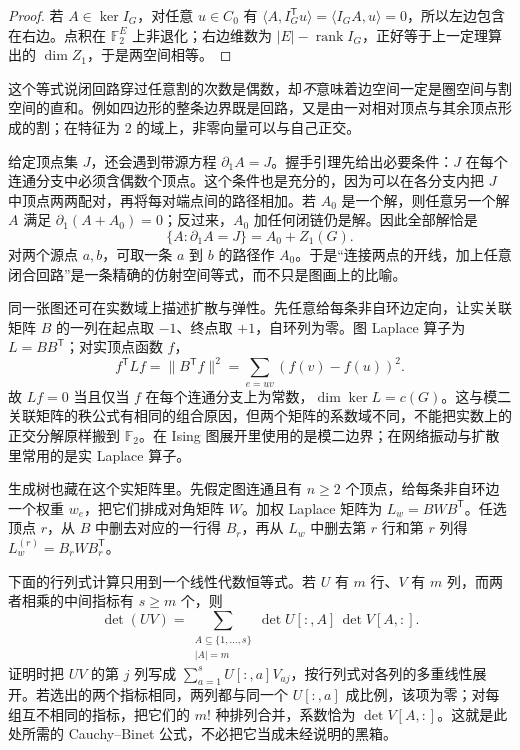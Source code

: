 \begin{proof}
若 $A\in\ker I_G$，对任意 $u\in C_0$ 有 $\langle A,I_G^{\mathsf T}u\rangle=\langle I_GA,u\rangle=0$，所以左边包含在右边。点积在 $\mathbb F_2^E$ 上非退化；右边维数为 $|E|-\operatorname{rank}I_G$，正好等于上一定理算出的 $\dim Z_1$，于是两空间相等。
\end{proof}

这个等式说闭回路穿过任意割的次数是偶数，却\emph{不}意味着边空间一定是圈空间与割空间的直和。例如四边形的整条边界既是回路，又是由一对相对顶点与其余顶点形成的割；在特征为 $2$ 的域上，非零向量可以与自己正交。

给定顶点集 $J$，还会遇到带源方程 $\partial_1A=J$。握手引理先给出必要条件：$J$ 在每个连通分支中必须含偶数个顶点。这个条件也是充分的，因为可以在各分支内把 $J$ 中顶点两两配对，再将每对端点间的路径相加。若 $A_0$ 是一个解，则任意另一个解 $A$ 满足 $\partial_1(A+A_0)=0$；反过来，$A_0$ 加任何闭链仍是解。因此全部解恰是
\begin{equation}
\{A:\partial_1A=J\}=A_0+Z_1(G).
\label{eq:advanced-graph-affine-source-primer}
\end{equation}
对两个源点 $a,b$，可取一条 $a$ 到 $b$ 的路径作 $A_0$。于是“连接两点的开线，加上任意闭合回路”是一条精确的仿射空间等式，而不只是图画上的比喻。

同一张图还可在实数域上描述扩散与弹性。先任意给每条非自环边定向，让实关联矩阵 $B$ 的一列在起点取 $-1$、终点取 $+1$，自环列为零。图 Laplace 算子为 $L=BB^{\mathsf T}$；对实顶点函数 $f$，
\[
f^{\mathsf T}Lf=\|B^{\mathsf T}f\|^2
=\sum_{e=uv}(f(v)-f(u))^2.
\]
故 $Lf=0$ 当且仅当 $f$ 在每个连通分支上为常数，$\dim\ker L=c(G)$。这与模二关联矩阵的秩公式有相同的组合原因，但两个矩阵的系数域不同，不能把实数上的正交分解原样搬到 $\mathbb F_2$。在 Ising 图展开里使用的是模二边界；在网络振动与扩散里常用的是实 Laplace 算子。

生成树也藏在这个实矩阵里。先假定图连通且有 $n\ge2$ 个顶点，给每条非自环边一个权重 $w_e$，把它们排成对角矩阵 $W$。加权 Laplace 矩阵为 $L_w=BWB^{\mathsf T}$。任选顶点 $r$，从 $B$ 中删去对应的一行得 $B_r$，再从 $L_w$ 中删去第 $r$ 行和第 $r$ 列得 $L_w^{(r)}=B_rWB_r^{\mathsf T}$。

下面的行列式计算只用到一个线性代数恒等式。若 $U$ 有 $m$ 行、$V$ 有 $m$ 列，而两者相乘的中间指标有 $s\ge m$ 个，则
\[
\det(UV)=\sum_{\substack{A\subseteq\{1,\ldots,s\}\\|A|=m}}
\det U[:,A]\,\det V[A,:].
\]
证明时把 $UV$ 的第 $j$ 列写成 $\sum_{a=1}^s U[:,a]V_{aj}$，按行列式对各列的多重线性展开。若选出的两个指标相同，两列都与同一个 $U[:,a]$ 成比例，该项为零；对每组互不相同的指标，把它们的 $m!$ 种排列合并，系数恰为 $\det V[A,:]$。这就是此处所需的 Cauchy--Binet 公式，不必把它当成未经说明的黑箱。

